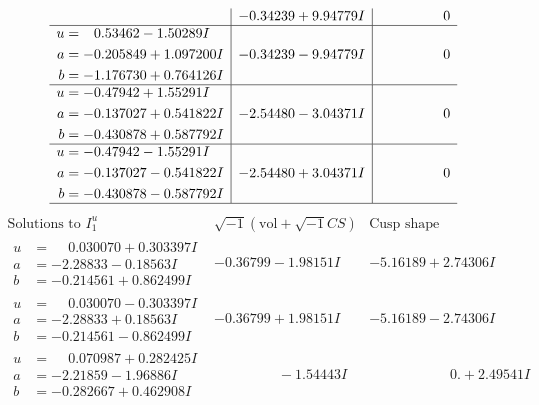 \documentclass[1p]{elsarticle_modified}
\theoremstyle{definition}
\newcommand{\I}{\sqrt{-1}}
\begin{document}
$$\begin{array}{c|c|c}
 & -0.34239 + 9.94779 I & \phantom{-0.000000 } 0 \\ \hline\begin{aligned}
u &= \phantom{-}0.53462 - 1.50289 I \\
a &= -0.205849 + 1.097200 I \\
b &= -1.176730 + 0.764126 I\end{aligned}
 & -0.34239 - 9.94779 I & \phantom{-0.000000 } 0 \\ \hline\begin{aligned}
u &= -0.47942 + 1.55291 I \\
a &= -0.137027 + 0.541822 I \\
b &= -0.430878 + 0.587792 I\end{aligned}
 & -2.54480 - 3.04371 I & \phantom{-0.000000 } 0 \\ \hline\begin{aligned}
u &= -0.47942 - 1.55291 I \\
a &= -0.137027 - 0.541822 I \\
b &= -0.430878 - 0.587792 I\end{aligned}
 & -2.54480 + 3.04371 I & \phantom{-0.000000 } 0\\
 \hline 
 \end{array}$$\newpage$$\begin{array}{c|c|c}  
\text{Solutions to }I^u_{1}& \I (\text{vol} + \sqrt{-1}CS) & \text{Cusp shape}\\
 \hline 
\begin{aligned}
u &= \phantom{-}0.030070 + 0.303397 I \\
a &= -2.28833 - 0.18563 I \\
b &= -0.214561 + 0.862499 I\end{aligned}
 & -0.36799 - 1.98151 I & -5.16189 + 2.74306 I \\ \hline\begin{aligned}
u &= \phantom{-}0.030070 - 0.303397 I \\
a &= -2.28833 + 0.18563 I \\
b &= -0.214561 - 0.862499 I\end{aligned}
 & -0.36799 + 1.98151 I & -5.16189 - 2.74306 I \\ \hline\begin{aligned}
u &= \phantom{-}0.070987 + 0.282425 I \\
a &= -2.21859 - 1.96886 I \\
b &= -0.282667 + 0.462908 I\end{aligned}
 & \phantom{-0.000000 } -1.54443 I & \phantom{-0.000000 -}0. + 2.49541 I \\ \hline\begin{aligned}

\end{aligned}
\end{array}$$
\end{document}
